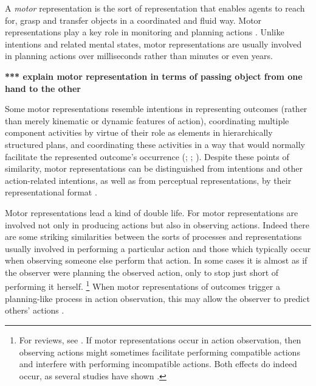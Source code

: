 \documentclass[12pt,\papersize]{extarticle}
\begin{document}
A \textit{motor} representation is the sort of representation that enables agents to reach for, grasp and transfer objects in a coordinated and fluid way. 
Motor representations play a key role in monitoring and planning actions  \citep[e.g.][]{wolpert:1995internal, miall:1996_forward,Wilson:2005qu}.
Unlike intentions and related mental states, motor representations are usually involved in planning actions over milliseconds rather than minutes or even years.

\textbf{*** explain motor representation in terms of passing object from one hand to the other}

Some motor representations resemble intentions  in 
	representing outcomes (rather than merely kinematic or dynamic features of action), 
	coordinating multiple  component activities by virtue of their role as elements in hierarchically structured plans,
	and coordinating these activities in a way that would normally facilitate the represented outcome's occurrence (\citealp{hamilton_action_2008}; \citealp[pp.\ 189-90]{pacherie:2008_action}; \citealp{butterfill:2012_intention}).
Despite these points of similarity, 
motor representations can be distinguished from intentions and other action-related intentions,
	 as well as from perceptual representations,
	 by their representational format \citep{butterfill:2012_intention}. 

Motor representations lead a kind of double life.
For motor representations are involved not only in producing actions but also in observing actions. 
Indeed there are some striking similarities between the sorts of processes and representations usually involved in performing a particular action and those which typically occur when observing someone else perform that action.
In some cases it is almost as if the observer were planning the observed action, only to stop just short of performing it herself.%
\footnote{ 
For reviews, see \citet{jeannerod_motor_2006,rizzolatti_mirrors_2008,rizzolatti_functional_2010}.
If motor representations occur in action observation, then observing actions might sometimes facilitate performing compatible actions and interfere with performing incompatible actions.  Both effects do indeed occur, as several studies have shown \citep{brass:2000_compatibility, craighero:2002_hand, kilner:2003_interference, costantini:2012_does}. 
}
When motor representations of outcomes trigger a planning-like process in action observation, this may allow the observer to predict others' actions \citep{Flanagan:2003lm,ambrosini:2011_grasping,ambrosini:2012_tie,Costantini:2012fk}.
\end{document}
